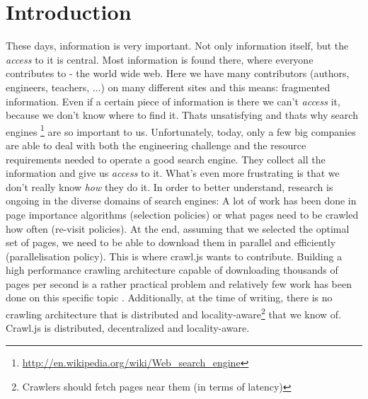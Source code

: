 
\chapter{Introduction} %

\label{Chapter1} %


These days, information is very important. Not only information itself, but the \emph{access} to it is central. Most information is found there, where everyone contributes to - the world wide web. Here we have many contributors (authors, engineers, teachers, ...) on many different sites and this means: fragmented information. Even if a certain piece of information is there we can't \emph{access} it, because we don't know where to find it. Thats unsatisfying and thats why search engines \footnote{\url{http://en.wikipedia.org/wiki/Web_search_engine}} are so important to us.
\newline
Unfortunately, today, only a few big companies are able to deal with both the engineering challenge and the resource requirements needed to operate a good search engine. They collect all the information and give us \emph{access} to it. What's even more frustrating is that we don't really know \emph{how} they do it. In order to better understand, research is ongoing in the diverse domains of search engines:
\newline
A lot of work has been done in page importance algorithms (selection policies) or what pages need to be crawled how often (re-visit policies)\cite{page_importance1}\cite{page_importance2}. At the end, assuming that we selected the optimal set of pages, we need to be able to download them in parallel and efficiently (parallelisation policy). This is where crawl.js wants to contribute. Building a high performance crawling architecture capable of downloading thousands of pages per second is a rather practical problem and relatively few work has been done on this specific topic \cite{ubicrawler}\cite{hp_crawler}. Additionally, at the time of writing, there is no crawling architecture that is distributed and locality-aware\footnote{Crawlers should fetch pages near them (in terms of latency)} that we know of.
\newline
Crawl.js is distributed, decentralized and locality-aware.

